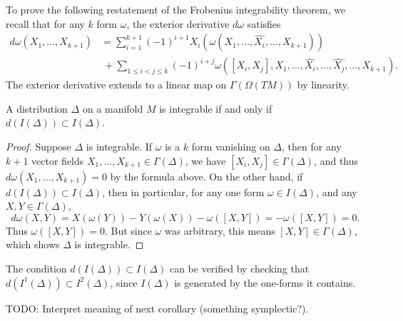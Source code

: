 To prove the following restatement of the Frobenius integrability theorem, we recall that for any $k$ form $\omega$, the exterior derivative $d\omega$ satisfies
%
\begin{align*}
    d\omega(X_1, \dots, X_{k+1}) &= \sum_{i=1}^{k+1} (-1)^{i+1} X_i(\omega(X_1, \dots, \widehat{X_i}, \dots, X_{k+1}))\\
    &\ + \sum_{1 \leq i < j \leq k} (-1)^{i+j} \omega([X_i,X_j], X_1, \dots, \widehat{X_i}, \dots, \widehat{X_j}, \dots, X_{k+1}).
\end{align*}
%
The exterior derivative extends to a linear map on $\Gamma(\Omega(TM))$ by linearity.

\begin{theorem}
    A distribution $\Delta$ on a manifold $M$ is integrable if and only if $d(I(\Delta)) \subset I(\Delta)$.
\end{theorem}
\begin{proof}
    Suppose $\Delta$ is integrable. If $\omega$ is a $k$ form vanishing on $\Delta$, then for any $k+1$ vector fields $X_1, \dots, X_{k+1} \in \Gamma(\Delta)$, we have $[X_i,X_j] \in \Gamma(\Delta)$, and thus $d\omega(X_1, \dots, X_{k+1}) = 0$ by the formula above. On the other hand, if $d(I(\Delta)) \subset I(\Delta)$, then in particular, for any one form $\omega \in I(\Delta)$, and any $X,Y \in \Gamma(\Delta)$,
    \[ d\omega(X,Y) = X(\omega(Y)) - Y(\omega(X)) - \omega([X,Y]) = - \omega([X,Y]) = 0. \]
    Thus $\omega([X,Y]) = 0$. But since $\omega$ was arbitrary, this means $[X,Y] \in \Gamma(\Delta)$, which shows $\Delta$ is integrable. 
\end{proof}

\begin{remark}
    The condition $d(I(\Delta)) \subset I(\Delta)$ can be verified by checking that $d(I^1(\Delta)) \subset I^2(\Delta)$, since $I(\Delta)$ is generated by the one-forms it contains.
\end{remark}

TODO: Interpret meaning of next corollary (something symplectic?).

